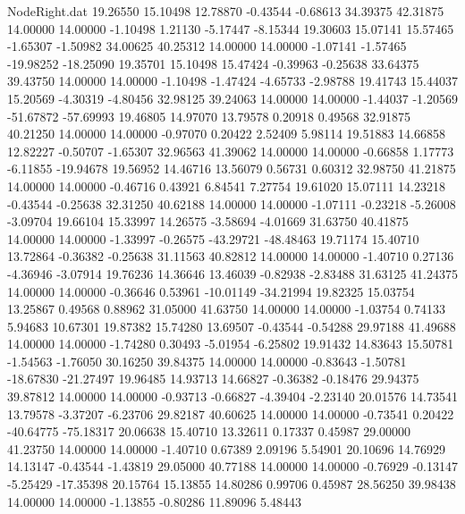 \begin{filecontents}{NodeRight.dat}
  19.26550   15.10498   12.78870    -0.43544   -0.68613   34.39375   42.31875   14.00000   14.00000   -1.10498    1.21130   -5.17447   -8.15344
  19.30603   15.07141   15.57465    -1.65307   -1.50982   34.00625   40.25312   14.00000   14.00000   -1.07141   -1.57465  -19.98252  -18.25090
  19.35701   15.10498   15.47424    -0.39963   -0.25638   33.64375   39.43750   14.00000   14.00000   -1.10498   -1.47424   -4.65733   -2.98788
  19.41743   15.44037   15.20569    -4.30319   -4.80456   32.98125   39.24063   14.00000   14.00000   -1.44037   -1.20569  -51.67872  -57.69993
  19.46805   14.97070   13.79578     0.20918    0.49568   32.91875   40.21250   14.00000   14.00000   -0.97070    0.20422    2.52409    5.98114
  19.51883   14.66858   12.82227    -0.50707   -1.65307   32.96563   41.39062   14.00000   14.00000   -0.66858    1.17773   -6.11855  -19.94678
  19.56952   14.46716   13.56079     0.56731    0.60312   32.98750   41.21875   14.00000   14.00000   -0.46716    0.43921    6.84541    7.27754
  19.61020   15.07111   14.23218    -0.43544   -0.25638   32.31250   40.62188   14.00000   14.00000   -1.07111   -0.23218   -5.26008   -3.09704
  19.66104   15.33997   14.26575    -3.58694   -4.01669   31.63750   40.41875   14.00000   14.00000   -1.33997   -0.26575  -43.29721  -48.48463
  19.71174   15.40710   13.72864    -0.36382   -0.25638   31.11563   40.82812   14.00000   14.00000   -1.40710    0.27136   -4.36946   -3.07914
  19.76236   14.36646   13.46039    -0.82938   -2.83488   31.63125   41.24375   14.00000   14.00000   -0.36646    0.53961  -10.01149  -34.21994
  19.82325   15.03754   13.25867     0.49568    0.88962   31.05000   41.63750   14.00000   14.00000   -1.03754    0.74133    5.94683   10.67301
  19.87382   15.74280   13.69507    -0.43544   -0.54288   29.97188   41.49688   14.00000   14.00000   -1.74280    0.30493   -5.01954   -6.25802
  19.91432   14.83643   15.50781    -1.54563   -1.76050   30.16250   39.84375   14.00000   14.00000   -0.83643   -1.50781  -18.67830  -21.27497
  19.96485   14.93713   14.66827    -0.36382   -0.18476   29.94375   39.87812   14.00000   14.00000   -0.93713   -0.66827   -4.39404   -2.23140
  20.01576   14.73541   13.79578    -3.37207   -6.23706   29.82187   40.60625   14.00000   14.00000   -0.73541    0.20422  -40.64775  -75.18317
  20.06638   15.40710   13.32611     0.17337    0.45987   29.00000   41.23750   14.00000   14.00000   -1.40710    0.67389    2.09196    5.54901
  20.10696   14.76929   14.13147    -0.43544   -1.43819   29.05000   40.77188   14.00000   14.00000   -0.76929   -0.13147   -5.25429  -17.35398
  20.15764   15.13855   14.80286     0.99706    0.45987   28.56250   39.98438   14.00000   14.00000   -1.13855   -0.80286   11.89096    5.48443

\end{filecontents}
